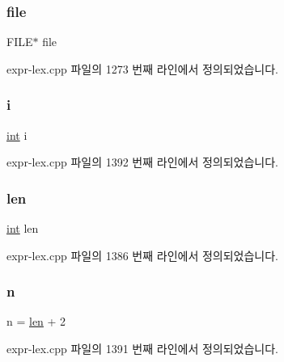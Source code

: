 \subsubsection{\texorpdfstring{file}{file}}
{\footnotesize\ttfamily F\+I\+LE$\ast$ file}



expr-\/lex.\+cpp 파일의 1273 번째 라인에서 정의되었습니다.

\mbox{\label{expr-lex_8cpp_acb559820d9ca11295b4500f179ef6392}} 
\subsubsection{\texorpdfstring{i}{i}}
{\footnotesize\ttfamily \mbox{\hyperlink{_util_8cpp_a0ef32aa8672df19503a49fab2d0c8071}{int}} i}



expr-\/lex.\+cpp 파일의 1392 번째 라인에서 정의되었습니다.

\mbox{\label{expr-lex_8cpp_afed088663f8704004425cdae2120b9b3}} 
\subsubsection{\texorpdfstring{len}{len}}
{\footnotesize\ttfamily \mbox{\hyperlink{_util_8cpp_a0ef32aa8672df19503a49fab2d0c8071}{int}} len}



expr-\/lex.\+cpp 파일의 1386 번째 라인에서 정의되었습니다.

\mbox{\label{expr-lex_8cpp_aeab71244afb687f16d8c4f5ee9d6ef0e}} 
\subsubsection{\texorpdfstring{n}{n}}
{\footnotesize\ttfamily n = \mbox{\hyperlink{expr-lex_8cpp_afed088663f8704004425cdae2120b9b3}{len}} + 2}



expr-\/lex.\+cpp 파일의 1391 번째 라인에서 정의되었습니다.

\mbox{\label{expr-lex_8cpp_ab7d671599a7b25ca99a487fa341bc33a}} 
